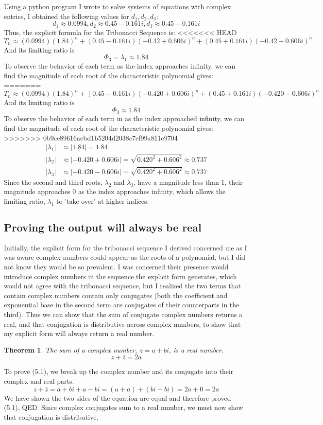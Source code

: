 \documentclass[11pt]{article}
\newtheorem{theorem}{Theorem}[section]
\begin{document}
Using a python program I wrote to solve systems of equations with complex entries, I obtained the following values for $d_1,d_2,d_3$:
\[d_1\approx0.0994,d_2\approx0.45-0.161i,d_3\approx0.45+0.161i\]
Thus, the explicit formula for the Tribonacci Sequence is:
<<<<<<< HEAD
\[T_n\approx(0.0994)(1.84)^n+(0.45-0.161i)(-0.42 + 0.606i)^n+(0.45+0.161i)(-0.42 - 0.606i)^n\]
And its limiting ratio is \[\Phi_3=\lambda_1\approx1.84\]
To observe the behavior of each term as the index approaches infinity, we can find the magnitude of each root of the characteristic polynomial gives: 
=======
\[T_n\approx(0.0994)(1.84)^n+(0.45-0.161i)(-0.420 + 0.606i)^n+(0.45+0.161i)(-0.420 - 0.606i)^n\]
And its limiting ratio is \[\Phi_3\approx1.84\]
To observe the behavior of each term in as the index approached infinity, we can find the magnitude of each root of the characteristic polynomial gives: 
>>>>>>> 0b9ce89616aebd1b5204d2038c7ef99a811e9704
\begin{align*}
    |\lambda_1|&\approx|1.84|=1.84 \\
    |\lambda_2|&\approx|-0.420 + 0.606i|=\sqrt{0.420^2+0.606^2}\approx 0.737\\
    |\lambda_3|&\approx|-0.420 - 0.606i|=\sqrt{0.420^2+0.606^2}\approx 0.737
\end{align*}
Since the second and third roots, \(\lambda_2\) and \(\lambda_3\), have a magnitude less than 1, their magnitude approaches 0 as the index approaches infinity, which allows the limiting ratio, \(\lambda_1\) to 'take over' at higher indices. 

\subsection{Proving the output will always be real}
Initially, the explicit form for the tribonacci sequence I derived concerned me as I was aware complex numbers could appear as the roots of a polynomial, but I did not know they would be so prevalent. I was concerned their presence would introduce complex numbers in the sequence the explicit form generates, which would not agree with the tribonacci sequence, but I realized the two terms that contain complex numbers contain only conjugates (both the coefficient and exponential base in the second term are conjugates of their counterparts in the third). Thus we can show that the sum of conjugate complex numbers returns a real, and that conjugation is distributive across complex numbers, to show that my explicit form will always return a real number. 
\begin{theorem}
    The sum of a complex number, \(z=a+bi\), is a real number. 
    \[z+\bar{z}=2a\]
\end{theorem}
To prove (5.1), we break up the complex number and its conjugate into their complex and real parts. 
\[z+\bar{z}=a+bi+a-bi=(a+a)+(bi-bi)=2a+0=2a\]
We have shown the two sides of the equation are equal and therefore proved (5.1), QED.
Since complex conjugates sum to a real number, we must now show that conjugation is distributive.
\end{document}

